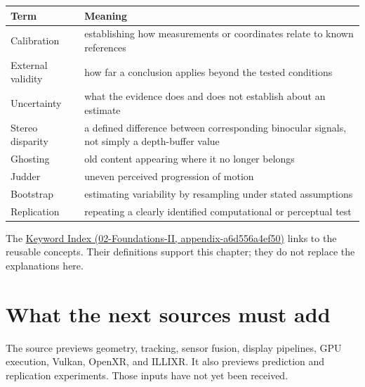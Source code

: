{\def\LTcaptype{none} %
\begin{longtable}[]{@{}
  >{\raggedright\arraybackslash}p{}
  >{\raggedright\arraybackslash}p{}@{}}
\toprule\noalign{}
\begin{minipage}[b]{\linewidth}\raggedright
Term
\end{minipage} & \begin{minipage}[b]{\linewidth}\raggedright
Meaning
\end{minipage} \\
\midrule\noalign{}
\endhead
\bottomrule\noalign{}
\endlastfoot
Calibration & establishing how measurements or coordinates relate to known references \\
External validity & how far a conclusion applies beyond the tested conditions \\
Uncertainty & what the evidence does and does not establish about an estimate \\
Stereo disparity & a defined difference between corresponding binocular signals, not simply a depth-buffer value \\
Ghosting & old content appearing where it no longer belongs \\
Judder & uneven perceived progression of motion \\
Bootstrap & estimating variability by resampling under stated assumptions \\
Replication & repeating a clearly identified computational or perceptual test \\
\end{longtable}
}

The \href{../02-Foundations-II/main.pdf\#nameddest=appendix-a6d556a4ef50}{Keyword Index (02-Foundations-II, appendix-a6d556a4ef50)} links to the reusable concepts. Their definitions support this chapter; they do not replace the explanations here.

\section{What the next sources must add}\label{04-visual-computing-ii-ch043-what-the-next-sources-must-add}

The source previews geometry, tracking, sensor fusion, display pipelines, GPU execution, Vulkan, OpenXR, and ILLIXR. It also previews prediction and replication experiments. Those inputs have not yet been received.

